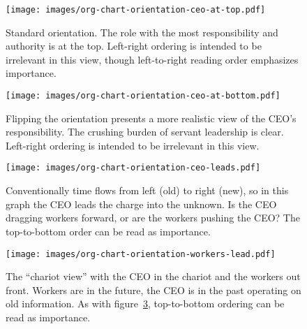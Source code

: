 \begin{figure}
\texttt{[image: images/org-chart-orientation-ceo-at-top.pdf]}
\caption{Standard orientation. The role with the most responsibility and authority is at the top. Left-right ordering is intended to be irrelevant in this view, though left-to-right reading order emphasizes importance.}
\label{fig:org_chart_orientation_ceo-at-top}
\end{figure}

\begin{figure}
\texttt{[image: images/org-chart-orientation-ceo-at-bottom.pdf]}
\caption{Flipping the orientation presents a more realistic view of the CEO's responsibility. The crushing burden of servant leadership is clear. Left-right ordering is intended to be irrelevant in this view.}
\label{fig:org_chart_orientation_ceo-at-bottom}
\end{figure}

\begin{figure}
\texttt{[image: images/org-chart-orientation-ceo-leads.pdf]}
\caption{Conventionally time flows from left (old) to right (new), so in this graph the CEO leads the charge into the unknown. Is the CEO dragging workers forward, or are the workers pushing the CEO? The top-to-bottom order can be read as importance. }
\label{fig:org_chart_orientation_ceo-leads}
\end{figure}

\begin{figure}
\texttt{[image: images/org-chart-orientation-workers-lead.pdf]}
\caption{The ``chariot view'' with the CEO in the chariot and the workers out front. Workers are in the future, the CEO is in the past operating on old information. As with figure~\ref{fig:org_chart_orientation_ceo-leads}, top-to-bottom ordering can be read as importance. }
\label{fig:org_chart_orientation_ceo-follows}
\end{figure}



